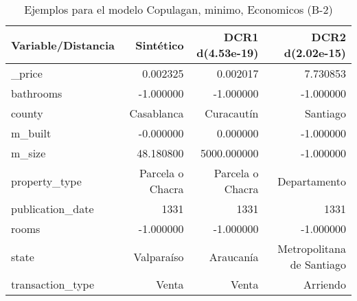 \begin{table}[H]
\centering
\fontsize{10}{14}\selectfont
\caption{Ejemplos para el modelo Copulagan, minimo, Economicos (B-2)}
\label{table-example-economicos-b-2-copulagan-min}
\begin{tabular}{|l|r|r|r|}
\hline
\rowcolor[gray]{0.8}
Variable/Distancia & Sintético & DCR1 d(4.53e-19) & DCR2 d(2.02e-15) \\
\hline \_price & \cellcolor[rgb]{0.9, 0.54, 0.52} 0.002325 & \cellcolor[rgb]{0.9, 0.54, 0.52} 0.002017 & 7.730853 \\
\hline bathrooms & \cellcolor[rgb]{0.9, 0.54, 0.52} -1.000000 & \cellcolor[rgb]{0.9, 0.54, 0.52} -1.000000 & \cellcolor[rgb]{0.9, 0.54, 0.52} -1.000000 \\
\hline county & \cellcolor[rgb]{0.9, 0.54, 0.52} Casablanca & Curacautín & Santiago \\
\hline m\_built & \cellcolor[rgb]{0.9, 0.54, 0.52} -0.000000 & \cellcolor[rgb]{0.9, 0.54, 0.52} 0.000000 & \cellcolor[rgb]{0.9, 0.54, 0.52} -1.000000 \\
\hline m\_size & \cellcolor[rgb]{0.9, 0.54, 0.52} 48.180800 & 5000.000000 & -1.000000 \\
\hline property\_type & \cellcolor[rgb]{0.9, 0.54, 0.52} Parcela o Chacra & \cellcolor[rgb]{0.9, 0.54, 0.52} Parcela o Chacra & Departamento \\
\hline publication\_date & \cellcolor[rgb]{0.9, 0.54, 0.52} 1331 & \cellcolor[rgb]{0.9, 0.54, 0.52} 1331 & \cellcolor[rgb]{0.9, 0.54, 0.52} 1331 \\
\hline rooms & \cellcolor[rgb]{0.9, 0.54, 0.52} -1.000000 & \cellcolor[rgb]{0.9, 0.54, 0.52} -1.000000 & \cellcolor[rgb]{0.9, 0.54, 0.52} -1.000000 \\
\hline state & \cellcolor[rgb]{0.9, 0.54, 0.52} Valparaíso & Araucanía & Metropolitana de Santiago \\
\hline transaction\_type & \cellcolor[rgb]{0.9, 0.54, 0.52} Venta & \cellcolor[rgb]{0.9, 0.54, 0.52} Venta & Arriendo \\
\hline
\end{tabular}
\end{table}
